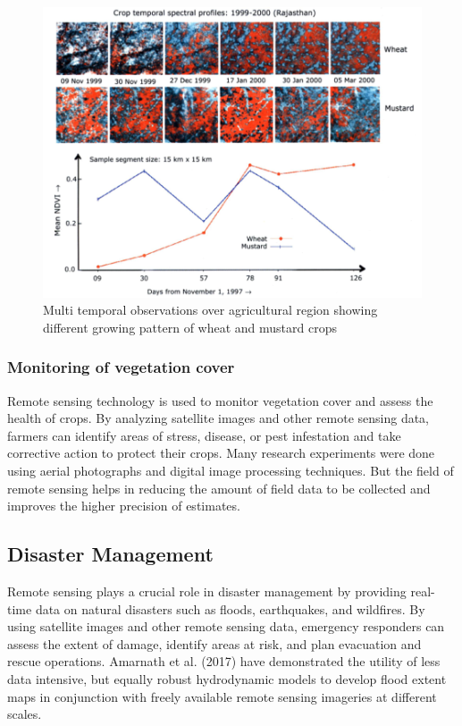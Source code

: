 \documentclass[conference]{IEEEtran}
\begin{document}
\begin{figure}
    \centering
    \includegraphics[width=\linewidth]{images/wheat-mustard.png}
    \caption{Multi temporal observations over agricultural region showing different growing pattern of wheat and mustard crops}
    \label{fig:application-agriculture}
\end{figure}
\subsubsection{Monitoring of vegetation cover}
Remote sensing technology is used to monitor vegetation cover and assess the health of crops. By analyzing satellite images and other remote sensing data, farmers can identify areas of stress, disease, or pest infestation and take corrective action to protect their crops. Many research experiments were done using aerial photographs and digital image processing techniques. But the field of remote sensing helps in reducing the amount of field data to be collected and improves the higher precision of estimates. \cite{shanmugapriya2019applications}

\subsection{Disaster Management}
Remote sensing plays a crucial role in disaster management by providing real-time data on natural disasters such as floods, earthquakes, and wildfires. By using satellite images and other remote sensing data, emergency responders can assess the extent of damage, identify areas at risk, and plan evacuation and rescue operations. Amarnath et al. (2017) have demonstrated the utility of less data intensive, but equally robust hydrodynamic models to develop flood extent maps in conjunction with freely available remote sensing imageries at different scales. \cite{Amarnath2024}
\end{document}
